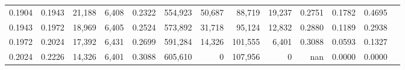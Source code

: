 \begin{tabular}{rrrrrrrrrrrrr}
0.1904 & 0.1943 & 21,188 & 6,408 &                                     0.2322 & 554,923 &  50,687 &  88,719 &  19,237 & 0.2751 & 0.1782 & 0.4695 \\
0.1943 & 0.1972 & 18,969 & 6,405 &                                     0.2524 & 573,892 &  31,718 &  95,124 &  12,832 & 0.2880 & 0.1189 & 0.2938 \\
0.1972 & 0.2024 & 17,392 & 6,431 &                                     0.2699 & 591,284 &  14,326 & 101,555 &   6,401 & 0.3088 & 0.0593 & 0.1327 \\
0.2024 & 0.2226 & 14,326 & 6,401 &                                     0.3088 & 605,610 &       0 & 107,956 &       0 &    nan & 0.0000 & 0.0000 \\
\bottomrule
\end{tabular}
